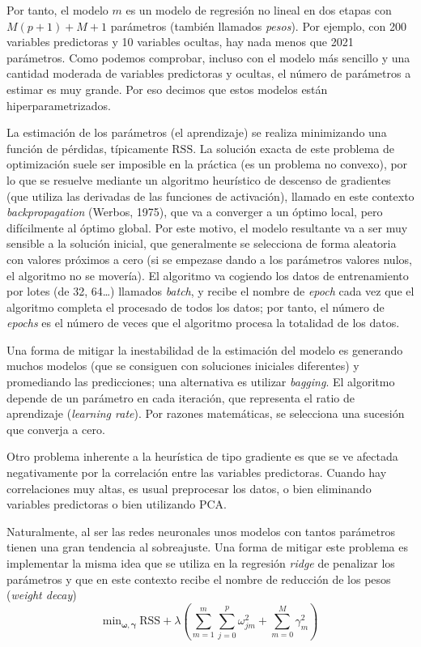 \documentclass[
]{book}
\theoremstyle{break}
\theoremstyle{definition}
\theoremstyle{definition}
\theoremstyle{definition}
\theoremstyle{definition}
\theoremstyle{remark}
\begin{document}
Por tanto, el modelo \(m\) es un modelo de regresión no lineal en dos etapas con \(M(p + 1) + M + 1\) parámetros (también llamados \emph{pesos}). Por ejemplo, con 200 variables predictoras y 10 variables ocultas, hay nada menos que 2021 parámetros. Como podemos comprobar, incluso con el modelo más sencillo y una cantidad moderada de variables predictoras y ocultas, el número de parámetros a estimar es muy grande. Por eso decimos que estos modelos están hiperparametrizados.

La estimación de los parámetros (el aprendizaje) se realiza minimizando una función de pérdidas, típicamente \(\mbox{RSS}\). La solución exacta de este problema de optimización suele ser imposible en la práctica (es un problema no convexo), por lo que se resuelve mediante un algoritmo heurístico de descenso de gradientes (que utiliza las derivadas de las funciones de activación), llamado en este contexto \emph{backpropagation} (Werbos, 1975), que va a converger a un óptimo local, pero difícilmente al óptimo global. Por este motivo, el modelo resultante va a ser muy sensible a la solución inicial, que generalmente se selecciona de forma aleatoria con valores próximos a cero (si se empezase dando a los parámetros valores nulos, el algoritmo no se movería). El algoritmo va cogiendo los datos de entrenamiento por lotes (de 32, 64\ldots) llamados \emph{batch}, y recibe el nombre de \emph{epoch} cada vez que el algoritmo completa el procesado de todos los datos; por tanto, el número de \emph{epochs} es el número de veces que el algoritmo procesa la totalidad de los datos.

Una forma de mitigar la inestabilidad de la estimación del modelo es generando muchos modelos (que se consiguen con soluciones iniciales diferentes) y promediando las predicciones; una alternativa es utilizar \emph{bagging}. El algoritmo depende de un parámetro en cada iteración, que representa el ratio de aprendizaje (\emph{learning rate}). Por razones matemáticas, se selecciona una sucesión que converja a cero.

Otro problema inherente a la heurística de tipo gradiente es que se ve afectada negativamente por la correlación entre las variables predictoras. Cuando hay correlaciones muy altas, es usual preprocesar los datos, o bien eliminando variables predictoras o bien utilizando PCA.

Naturalmente, al ser las redes neuronales unos modelos con tantos parámetros tienen una gran tendencia al sobreajuste. Una forma de mitigar este problema es implementar la misma idea que se utiliza en la regresión \emph{ridge} de penalizar los parámetros y que en este contexto recibe el nombre de reducción de los pesos (\emph{weight decay})
\[\mbox{min}_{\boldsymbol{\omega}, \boldsymbol{\gamma}}\ \mbox{RSS} + 
\lambda \left(\sum_{m=1}^m \sum_{j=0}^p \omega_{jm}^2 + \sum_{m=0}^M \gamma_m^2
\right)\]
\end{document}
